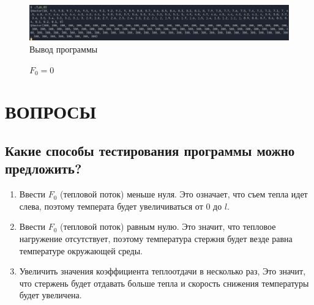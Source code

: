 \begin{figure}[H]
    \centering
    \includegraphics[scale=0.40]{img/ZeroPrint.png}
    \caption{Вывод программы}
\end{figure}

\begin{figure}[H]
    \caption{$F_0=0$}
    \label{img:noteven}
\end{figure}

\section{ВОПРОСЫ}

\subsection{Какие способы тестирования программы можно предложить?}

\begin{enumerate}
    \item Ввести $F_0$ (тепловой поток) меньше нуля. Это означает, что съем тепла идет слева, поэтому температа будет увеличиваться от $0$ до $l$.
    \item Ввести $F_0$ (тепловой поток) равным нулю. Это значит, что тепловое нагружение отсутствует, поэтому температура стержня будет везде равна температуре окружающей среды.
    \item Увеличить значения коэффициента теплоотдачи в несколько раз, Это значит, что стержень будет отдавать больше тепла и скорость снижения температуры будет увеличена.
\end{enumerate}

